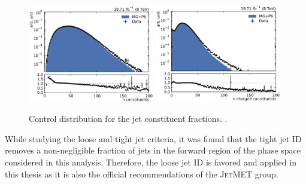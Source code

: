 \begin{figure}[htbp]
    \centering
    \includegraphics[width=0.49\textwidth]{figures/measurement/jet_constituent_nConstituents.pdf}\hfill
    \includegraphics[width=0.49\textwidth]{figures/measurement/jet_constituent_nCharged.pdf}
    \caption{Control distribution for the jet constituent fractions. .}
    \label{fig:jet_constituents_counts}
\end{figure}


While studying the loose and tight jet criteria, it was found that the tight jet
ID removes a non-negligible fraction of jets in the forward region of the
phase space considered in this analysis. Therefore, the loose jet ID is favored
and applied in this thesis as it is also the official recommendations of the
\textsc{JetMET} group.



